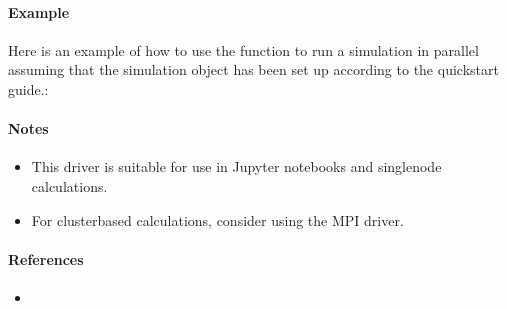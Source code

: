 \documentclass[letterpaper,10pt,english]{sphinxmanual}
\begin{document}
\paragraph{Example}
\label{\detokenize{user_guide/drivers/parallel_driver_multiprocessing:example}}
\sphinxAtStartPar
Here is an example of how to use the  function to run a simulation in parallel assuming
that the simulation object has been set up according to the quickstart guide.:

\begin{sphinxVerbatim}[commandchars=\\\{\}]
   

   
\end{sphinxVerbatim}


\paragraph{Notes}
\label{\detokenize{user_guide/drivers/parallel_driver_multiprocessing:notes}}\begin{itemize}
\item {} 
\sphinxAtStartPar
This driver is suitable for use in Jupyter notebooks and single\sphinxhyphen{}node calculations.

\item {} 
\sphinxAtStartPar
For cluster\sphinxhyphen{}based calculations, consider using the MPI driver.

\end{itemize}


\paragraph{References}
\label{\detokenize{user_guide/drivers/parallel_driver_multiprocessing:references}}\begin{itemize}
\item {} 
\sphinxAtStartPar
{}

\end{itemize}
\end{document}
